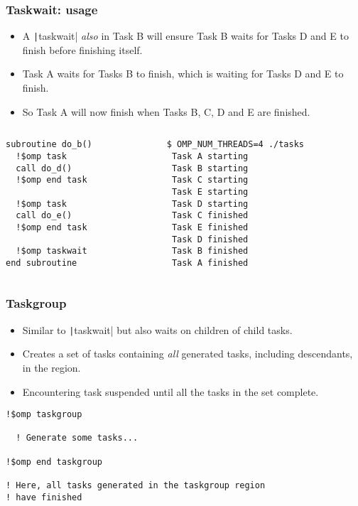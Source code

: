 \documentclass{beamer}
\begin{document}
\begin{frame}[fragile]
\frametitle{Taskwait: usage}

\begin{itemize}
  \item A \texttt|taskwait| \emph{also} in Task B will ensure Task B waits for Tasks D and E to finish before finishing itself.
  \item Task A waits for Tasks B to finish, which is waiting for Tasks D and E to finish.
  \item So Task A will now finish when Tasks B, C, D and E are finished.
\end{itemize}

\begin{columns}
\begin{column}{0.5\textwidth}
\begin{verbatim}
subroutine do_b()
  !$omp task
  call do_d()
  !$omp end task

  !$omp task
  call do_e()
  !$omp end task

  !$omp taskwait
end subroutine
\end{verbatim}
\end{column}

\begin{column}{0.5\textwidth}
\begin{verbatim}
$ OMP_NUM_THREADS=4 ./tasks
 Task A starting
 Task B starting
 Task C starting
 Task E starting
 Task D starting
 Task C finished
 Task E finished
 Task D finished
 Task B finished
 Task A finished
\end{verbatim}
\end{column}

\end{columns}
\end{frame}

\begin{frame}[fragile]
\frametitle{Taskgroup}

\begin{itemize}
  \item Similar to \texttt|taskwait| but also waits on children of child tasks.
  \item Creates a set of tasks containing \emph{all} generated tasks, including descendants, in the region.
  \item Encountering task suspended until all the tasks in the set complete.
\end{itemize}

\begin{verbatim}
!$omp taskgroup

  ! Generate some tasks...

!$omp end taskgroup

! Here, all tasks generated in the taskgroup region
! have finished

\end{verbatim}

\end{frame}
\end{document}
